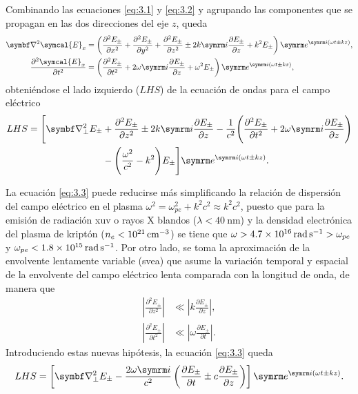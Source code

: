 Combinando las ecuaciones \eqref{eq:3.1} y \eqref{eq:3.2} y agrupando las componentes que se propagan en las dos direcciones del eje $z$, queda 
\begin{align}
    \grad^2\symcal{E}_x
    &=
    \left(\frac{\partial^2 E_{\pm}}{\partial x^2} + \frac{\partial^2 E_{\pm}}{\partial y^2} + \frac{\partial^2 E_{\pm}}{\partial z^2} \pm 2k\iu\frac{\partial E_{\pm}}{\partial z} + k^2 E_{\pm}\right)\eu^{\iu(\omega t \pm kz)}, \\
    \frac{\partial^2 \symcal{E}_x}{\partial t^2}
    &=
    \left(\frac{\partial^2 E_{\pm}}{\partial t^2} + 2\omega\iu\frac{\partial E_{\pm}}{\partial z} + \omega^2E_{\pm}\right)\eu^{\iu(\omega t \pm kz)}, 
\end{align}
\noindent
obteniéndose el lado izquierdo ($LHS$) de la ecuación de ondas para el campo eléctrico
\begin{equation}\label{eq:3.3}
    \begin{split}
        LHS 
        =
        \Bigg[\grad^2_{\perp} E_{\pm} &+ \frac{\partial^2 E_{\pm}}{\partial z^2} \pm 2k\iu \frac{\partial E_{\pm}}{\partial z} 
        -\frac{1}{c^2} \Bigg(\frac{\partial^2 E_{\pm}}{\partial t^2} + 2\omega\iu\frac{\partial E_{\pm}}{\partial z} \Bigg) \\
        &- \Bigg(\frac{\omega^2}{c^2} - k^2 \Bigg)E_{\pm} \Bigg] \eu^{\iu(\omega t \pm kz)}.
    \end{split}
\end{equation}

La ecuación \eqref{eq:3.3} puede reducirse más simplificando la relación de dispersión del campo eléctrico en el plasma $\omega^2 = \omega_{pe}^2 + k^2c^2\approx k^2c^2$, puesto que para la emisión de radiación \acrshort{xuv} o rayos X blandos ($\lambda<\qty{40}{\nm}$) y la densidad electrónica del plasma de kriptón ($n_e<\qty{d21}{cm^{-3}}$) se tiene 
que $\omega>\qty{4,7d16}{\radian\per\s}>\omega_{pe}$ y $\omega_{pe}<\qty{1,8d15}{\radian\per\s}$. Por otro lado, se toma la aproximación de la envolvente lentamente variable (\acrshort{svea}) que asume la variación temporal y espacial de la envolvente del campo eléctrico lenta comparada con la longitud de onda, de manera que
\begin{align}
    \left|\frac{\partial^2 E_{\pm}}{\partial z^2}\right| &\ll \left|k\frac{\partial E_{\pm}}{\partial z}\right|, \\
     \left|\frac{\partial^2 E_{\pm}}{\partial t^2}\right| &\ll \left|\omega\frac{\partial E_{\pm}}{\partial t}\right|.
\end{align}
\noindent
Introduciendo estas nuevas hipótesis, la ecuación \eqref{eq:3.3} queda
\begin{equation}
    LHS 
    =
    \left[\grad^2_{\perp}E_{\pm} - \frac{2\omega\iu}{c^2}\left(\frac{\partial E_{\pm}}{\partial t} \pm c\frac{\partial E_{\pm}}{\partial z}\right)\right]\eu^{\iu(\omega t \pm kz)}.
\end{equation}

